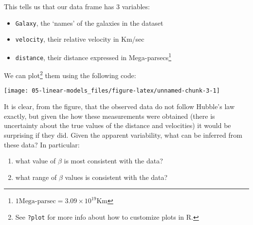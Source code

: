 \documentclass[
]{book}
\newenvironment{Shaded}{\begin{snugshade}}{\end{snugshade}}
\newcommand{\AttributeTok}[1]{\textcolor[rgb]{0.13,0.29,0.53}{#1}}
\newcommand{\CommentTok}[1]{\textcolor[rgb]{0.56,0.35,0.01}{\textit{#1}}}
\newcommand{\DecValTok}[1]{\textcolor[rgb]{0.00,0.00,0.81}{#1}}
\newcommand{\FunctionTok}[1]{\textcolor[rgb]{0.13,0.29,0.53}{\textbf{#1}}}
\newcommand{\NormalTok}[1]{#1}
\newcommand{\SpecialCharTok}[1]{\textcolor[rgb]{0.81,0.36,0.00}{\textbf{#1}}}
\newcommand{\StringTok}[1]{\textcolor[rgb]{0.31,0.60,0.02}{#1}}
\providecommand{\tightlist}{%
  \setlength{\itemsep}{0pt}\setlength{\parskip}{0pt}}
\begin{document}
This tells us that our data frame has 3 variables:

\begin{itemize}
\tightlist
\item
  \texttt{Galaxy}, the `names' of the galaxies in the dataset
\item
  \texttt{velocity}, their relative velocity in Km/sec
\item
  \texttt{distance}, their distance expressed in Mega-parsecs\footnote{\(1 \text{Mega-parsec} = 3.09 \times 10^{19} \text{Km}\)}
\end{itemize}

We can plot\footnote{See \texttt{?plot} for more info about how to customize plots in R.} them using the following code:

\begin{Shaded}
\end{Shaded}

\begin{center}\texttt{[image: 05-linear-models\_files/figure-latex/unnamed-chunk-3-1]} \end{center}

It is clear, from the figure, that the observed data do not follow Hubble's law exactly, but given the how these measurements were obtained (there is uncertainty about the true values of the distance and velocities) it would be surprising if they did. Given the apparent variability, what can be inferred from these data?
In particular:

\begin{enumerate}
\def\labelenumi{\arabic{enumi}.}
\tightlist
\item
  what value of \(\beta\) is most consistent with the data?
\item
  what range of \(\beta\) values is consistent with the data?
\end{enumerate}
\end{document}
